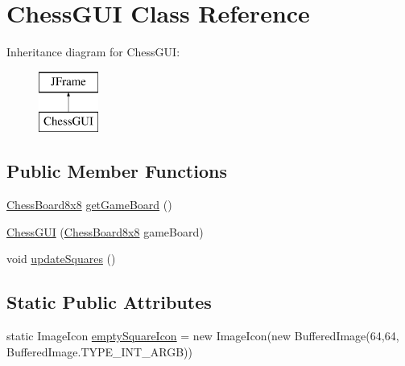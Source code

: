 \hypertarget{class_chess_g_u_i}{}\section{Chess\+G\+UI Class Reference}
\label{class_chess_g_u_i}
Inheritance diagram for Chess\+G\+UI\+:\begin{figure}[H]
\begin{center}
\leavevmode
\includegraphics[height=2.000000cm]{class_chess_g_u_i}
\end{center}
\end{figure}
\subsection*{Public Member Functions}
\begin{DoxyCompactItemize}
\item 
\mbox{\hyperlink{class_chess_board8x8}{Chess\+Board8x8}} \mbox{\hyperlink{class_chess_g_u_i_ae04ce28bde04da3c93167de58db063fa}{get\+Game\+Board}} ()
\item 
\mbox{\hyperlink{class_chess_g_u_i_a3ec1066101fd275f05c2579d120af460}{Chess\+G\+UI}} (\mbox{\hyperlink{class_chess_board8x8}{Chess\+Board8x8}} game\+Board)
\item 
void \mbox{\hyperlink{class_chess_g_u_i_a45a6b641c9d22eef15ad1b64673e65d9}{update\+Squares}} ()
\end{DoxyCompactItemize}
\subsection*{Static Public Attributes}
\begin{DoxyCompactItemize}
\item 
static Image\+Icon \mbox{\hyperlink{class_chess_g_u_i_a950a91cc4c06f416fcd27990cda2023b}{empty\+Square\+Icon}} = new Image\+Icon(new Buffered\+Image(64,64, Buffered\+Image.\+T\+Y\+P\+E\+\_\+\+I\+N\+T\+\_\+\+A\+R\+GB))
\end{DoxyCompactItemize}
